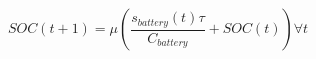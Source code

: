 \begin{equation}
	SOC(t+1) = \mu\left(\frac{s_{battery}(t)\tau}{C_{battery}} + SOC(t)\right) \forall t
	\label{ch1:equ:next-state-of-charge}
\end{equation}